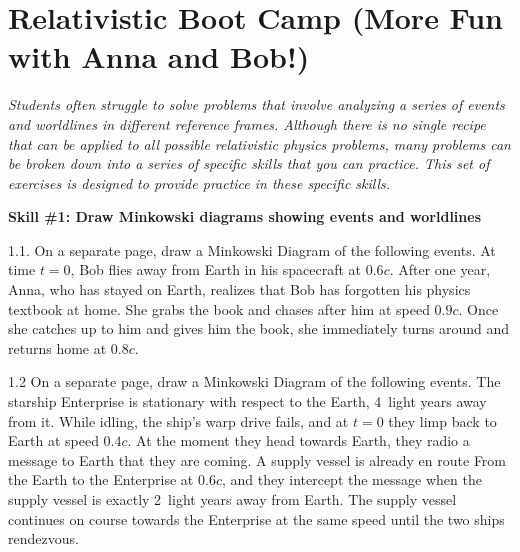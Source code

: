 \section{Relativistic Boot Camp (More Fun with Anna and Bob!)}


\bigskip

\textit{Students often struggle to solve problems that involve analyzing a series of events and worldlines in different reference frames.  Although there is no single recipe that can be applied to all possible relativistic physics problems, many problems can be broken down into a series of specific skills that you can practice.  This set of exercises is designed to provide practice in these specific skills.}

\textbf{Skill \#1: Draw Minkowski diagrams showing events and worldlines}

1.1. On a separate page, draw a Minkowski Diagram of the following events.  At time $t=0$, Bob flies away from Earth in his spacecraft at $0.6 c$.  After one year, Anna, who has stayed on Earth, realizes that Bob has forgotten his physics textbook at home.  She grabs the book and chases after him at speed $0.9 c$.  Once she catches up to him and gives him the book, she immediately turns around and returns home at $0.8 c$.  
\bigskip

1.2 On a separate page, draw a Minkowski Diagram of the following events.  The starship Enterprise is stationary with respect to the Earth, 4~light years away from it.  While idling, the ship's warp drive fails, and at $t=0$ they limp back to Earth at speed $0.4 c$.  At the moment they head towards Earth, they radio a message to Earth that they are coming.  A supply vessel is already en route From the Earth to the Enterprise at $0.6 c$, and they intercept the message when the supply vessel is exactly 2~light years away from Earth.  The supply vessel continues on course towards the Enterprise at the same speed until the two ships rendezvous.  
\bigskip

